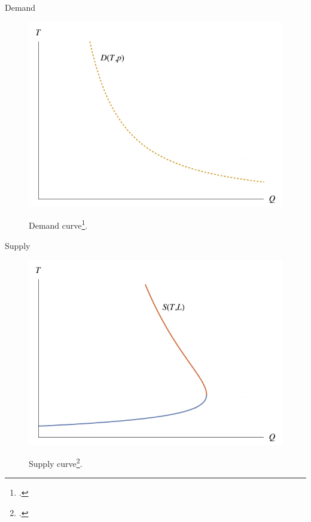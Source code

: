     \begin{frame}{Demand}
        \begin{figure}
            \centering
            {\includegraphics[scale=0.30]{plots/demand.png}}
            \caption{Demand curve\footcite{castillo2017surge}.}
        \end{figure}
    \end{frame}

    \begin{frame}{Supply}
        \begin{figure}
            \centering
            {\includegraphics[scale=0.30]{plots/supply.png}}
            \caption{Supply curve\footcite{castillo2017surge}.}
        \end{figure}
    \end{frame}

